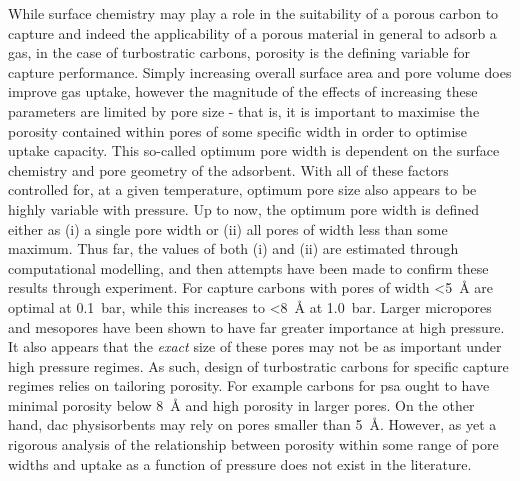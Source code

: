 While surface chemistry may play a role in the suitability of a porous carbon to capture  and indeed the applicability of a porous material in general to adsorb a gas,\citep{Lueking2004, Li2011a, Li2020Sustainable, wang2012significantly, Botome2017Preparation, liang2013, Kayal2018Activated} in the case of \glspl{turbostratic carbon}, porosity is the defining variable for  capture performance.\citep{Sevilla2014Energy, Adeniran2016Is, Sevilla2013Assessment, Choi2019Unique, Lee2013Determination, Presser2011Effect, Wickramaratne2013Importance}  Simply increasing overall surface area and pore volume does improve gas uptake,\citep{Cox2017Ultra, Blankenship2017Cigarette} however the magnitude of the effects of increasing these parameters are limited by pore size\citep{Sevilla2014Energy, Sevilla2013Assessment, Choi2019Unique, Li2019Selective, Cabria2007optimum, Gogotsi2009, Masika2012} - that is, it is important to maximise the porosity contained within pores of some specific width in order to optimise  uptake capacity. This so-called optimum pore width is dependent on the surface chemistry\citep{wang2012significantly, Kayal2018Activated, Lueking2004} and pore geometry\citep{Rzepka1998Physisorption, Zhou2004comparative, Hlushak2018Heat} of the \gls{adsorbent}. With all of these factors controlled for, at a given temperature, optimum pore size also appears to be highly variable with pressure.\citep{Presser2011Effect, DelaCasaLillo2002Hydrogen} Up to now, the optimum pore width is defined either as (i) a single pore width\citep{Sevilla2014Energy, Choi2019Unique, Li2019Selective} or (ii) all pores of width less than some maximum.\citep{Biloe2002Optimal, Cabria2007optimum, Presser2011Effect} Thus far, the values of both (i) and (ii) are estimated through computational modelling,\citep{Biloe2002Optimal, Cabria2007optimum, Hlushak2018Heat} and then attempts have been made to confirm these results through experiment.\citep{Choi2019Unique, Presser2011Effect} For  capture carbons with pores of width \qty{<5}{\angstrom} are optimal at \qty{0.1}{\bar}, while this increases to \qty{<8}{\angstrom} at \qty{1.0}{\bar}.\citep{Presser2011Effect} Larger \glspl{micropore} and \glspl{mesopore} have been shown to have far greater importance at high pressure.\citep{Sevilla2013Assessment, Casco2014Effect, Sevilla2018Optimization} It also appears that the \textit{exact} size of these pores may not be as important under high pressure regimes.\citep{Blankenship2022Modulating} As such, design of \glspl{turbostratic carbon} for specific  capture regimes relies on tailoring porosity. For example carbons for \acrshort{psa} ought to have minimal porosity below \qty{8}{\angstrom} and high porosity in larger pores. On the other hand, \acrshort{dac} physisorbents may rely on pores smaller than \qty{5}{\angstrom}. However, as yet a rigorous analysis of the relationship between porosity within some range of pore widths and  uptake as a function of pressure does not exist in the literature.


